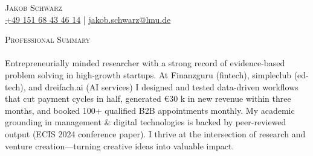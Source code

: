 \documentclass[a4paper]{article}
\newcommand{\lineunder} {
    \vspace*{-8pt} \\
    \hspace*{-18pt} \hrulefill \\
}
\newcommand{\header} [1] {
    {\hspace*{-18pt}\vspace*{6pt} \textsc{#1}}
    \vspace*{-6pt} \lineunder
}
\begin{document}
\vspace*{-40pt}
    

\vspace*{-10pt}
\begin{center}
	{\Huge \scshape {Jakob Schwarz}}\\
	\href{tel:+4915168434614}{+49 151 68 43 46 14} | \href{mailto:jakob.schwarz@lmu.de}{jakob.schwarz@lmu.de} %
\end{center}

\header{Professional Summary}

Entrepreneurially minded researcher with a strong record of evidence-based problem solving in high-growth startups.   At Finanzguru (fintech), simpleclub (ed-tech), and dreifach.ai (AI services) I designed and tested data-driven workflows that cut payment cycles in half, generated €30 k in new revenue within three months, and booked 100+ qualified B2B appointments monthly.  My academic grounding in management \& digital technologies is backed by peer-reviewed output (ECIS 2024 conference paper).  I thrive at the intersection of research and venture creation—turning creative ideas into valuable impact. \\

\vspace{2mm}
\end{document}
